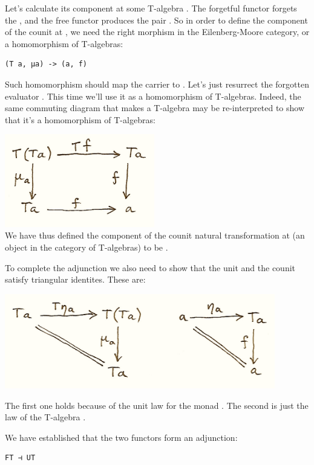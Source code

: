 Let's calculate its component at some T-algebra . The
forgetful functor forgets the , and the free functor produces
the pair . So in order to define the component of
the counit  at , we need the right morphism in
the Eilenberg-Moore category, or a homomorphism of T-algebras:

\begin{verbatim}
(T a, μa) -> (a, f)
\end{verbatim}

Such homomorphism should map the carrier  to .
Let's just resurrect the forgotten evaluator . This time we'll
use it as a homomorphism of T-algebras. Indeed, the same commuting
diagram that makes  a T-algebra may be re-interpreted to show
that it's a homomorphism of T-algebras:

\includegraphics[width=2.57292in]{images/talg31.png}\\
We have thus defined the component of the counit natural transformation
 at  (an object in the category of T-algebras)
to be .

To complete the adjunction we also need to show that the unit and the
counit satisfy triangular identites. These are:

\includegraphics[width=4.64583in]{images/talg4.png}

The first one holds because of the unit law for the monad .
The second is just the law of the T-algebra .

We have established that the two functors form an adjunction:

\begin{verbatim}
FT ⊣ UT
\end{verbatim}

